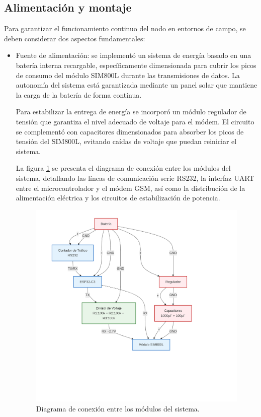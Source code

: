 
\subsection{Alimentación y montaje}

Para garantizar el funcionamiento continuo del nodo en entornos de campo,
se deben considerar dos aspectos fundamentales:
\begin{itemize}
\item Fuente de alimentación: se implementó un sistema de energía basado en una batería interna recargable, específicamente dimensionada para cubrir los picos de consumo del módulo SIM800L durante las transmisiones de datos. La autonomía del sistema está garantizada mediante un panel solar que mantiene la carga de la batería de forma continua.

Para estabilizar la entrega de energía se incorporó un módulo regulador de tensión que garantiza el nivel adecuado de voltaje para el módem. El circuito se complementó con capacitores dimensionados para absorber los picos de tensión del SIM800L, evitando caídas de voltaje que puedan reiniciar el sistema.

La figura \ref{fig:diag_conexiones} se presenta el diagrama de conexión entre los módulos del sistema, detallando las líneas de comunicación serie RS232, la interfaz UART entre el microcontrolador y el módem GSM, así como la distribución de la alimentación eléctrica y los circuitos de estabilización de potencia.

\begin{figure}[htbp]
  \raggedleft
  \includegraphics[width=1\linewidth]{./Figures/diagConexion.png}
  \caption{Diagrama de conexión entre los módulos del sistema.}
  \label{fig:diag_conexiones}
\end{figure}




\end{itemize}
